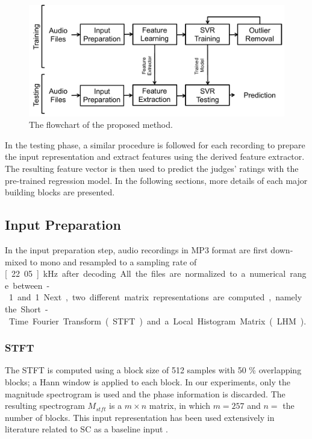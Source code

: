 \documentclass[conference]{IEEEtran}
\begin{document}
\begin{figure}
\centering
\includegraphics[width = 8 cm]{./figs/flowchart.pdf}
\caption{The flowchart of the proposed method.}
\label{fig:flowchart}
\end{figure}

In the testing phase, a similar procedure is followed for each recording to prepare the input representation and extract features using the derived feature extractor. The resulting feature vector is then used to predict the judges' ratings with the pre-trained regression model. In the following sections, more details of each major building blocks are presented. 

\subsection{Input Preparation}\label{subsec:input}
In the input preparation step, audio recordings in MP3 format are first down-mixed to mono and resampled to a sampling rate of \unit[22.05]{kHz} after decoding. All the files are normalized to a numerical range between -1 and 1. Next, two different matrix representations are computed, namely the Short-Time Fourier Transform (STFT) and a Local Histogram Matrix (LHM). 

\subsubsection{STFT}\label{subsec:stft}
The STFT is computed using a block size of 512 samples with 50 \% overlapping blocks; a Hann window is applied to each block. In our experiments, only the magnitude spectrogram is used and the phase information is discarded. The resulting spectrogram $M_{stft}$ is a $m \times n$ matrix, in which $m = 257$ and $n = $ the number of blocks. This input representation has been used extensively in literature related to SC as a baseline input \cite{Su2014Guitar, Su2014Violin}. 
\end{document}
